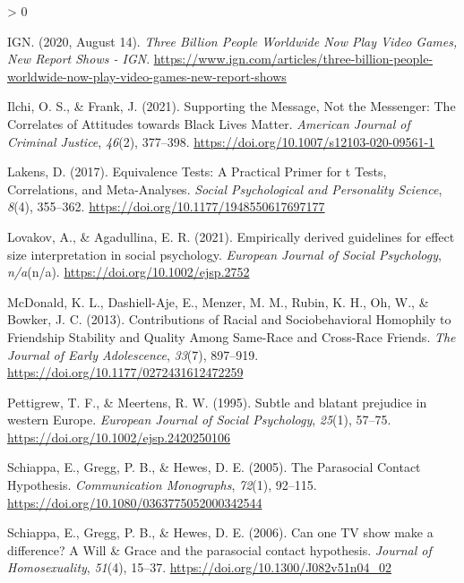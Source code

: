 \documentclass[
  english,
  man, noextraspace,floatsintext]{apa6}
\newlength{\cslhangindent}
\newenvironment{CSLReferences}[2] %
 {%
  \setlength{\parindent}{0pt}
  \ifodd #1 \everypar{\setlength{\hangindent}{\cslhangindent}}\ignorespaces\fi
  \ifnum #2 > 0
  \setlength{\parskip}{#2\baselineskip}
  \fi
 }%
 {}
\begin{document}
\begin{CSLReferences}{1}{0}
\leavevmode\hypertarget{ref-ignThreeBillionPeople2020}{}%
IGN. (2020, August 14). \emph{Three {Billion People Worldwide Now Play Video Games}, {New Report Shows} - {IGN}}. \url{https://www.ign.com/articles/three-billion-people-worldwide-now-play-video-games-new-report-shows}

\leavevmode\hypertarget{ref-ilchiSupportingMessageNot2021}{}%
Ilchi, O. S., \& Frank, J. (2021). Supporting the {Message}, {Not} the {Messenger}: {The Correlates} of {Attitudes} towards {Black Lives Matter}. \emph{American Journal of Criminal Justice}, \emph{46}(2), 377--398. \url{https://doi.org/10.1007/s12103-020-09561-1}

\leavevmode\hypertarget{ref-lakensEquivalenceTestsPractical2017}{}%
Lakens, D. (2017). Equivalence {Tests}: {A Practical Primer} for t {Tests}, {Correlations}, and {Meta}-{Analyses}. \emph{Social Psychological and Personality Science}, \emph{8}(4), 355--362. \url{https://doi.org/10.1177/1948550617697177}

\leavevmode\hypertarget{ref-lovakovEmpiricallyDerivedGuidelines2021}{}%
Lovakov, A., \& Agadullina, E. R. (2021). Empirically derived guidelines for effect size interpretation in social psychology. \emph{European Journal of Social Psychology}, \emph{n/a}(n/a). \url{https://doi.org/10.1002/ejsp.2752}

\leavevmode\hypertarget{ref-mcdonaldContributionsRacialSociobehavioral2013}{}%
McDonald, K. L., Dashiell-Aje, E., Menzer, M. M., Rubin, K. H., Oh, W., \& Bowker, J. C. (2013). Contributions of {Racial} and {Sociobehavioral Homophily} to {Friendship Stability} and {Quality Among Same}-{Race} and {Cross}-{Race Friends}. \emph{The Journal of Early Adolescence}, \emph{33}(7), 897--919. \url{https://doi.org/10.1177/0272431612472259}

\leavevmode\hypertarget{ref-pettigrewSubtleBlatantPrejudice1995}{}%
Pettigrew, T. F., \& Meertens, R. W. (1995). Subtle and blatant prejudice in western {Europe}. \emph{European Journal of Social Psychology}, \emph{25}(1), 57--75. \url{https://doi.org/10.1002/ejsp.2420250106}

\leavevmode\hypertarget{ref-schiappaParasocialContactHypothesis2005}{}%
Schiappa, E., Gregg, P. B., \& Hewes, D. E. (2005). The {Parasocial Contact Hypothesis}. \emph{Communication Monographs}, \emph{72}(1), 92--115. \url{https://doi.org/10.1080/0363775052000342544}

\leavevmode\hypertarget{ref-schiappaCanOneTV2006}{}%
Schiappa, E., Gregg, P. B., \& Hewes, D. E. (2006). Can one {TV} show make a difference? {A Will} \& {Grace} and the parasocial contact hypothesis. \emph{Journal of Homosexuality}, \emph{51}(4), 15--37. \url{https://doi.org/10.1300/J082v51n04_02}


\end{CSLReferences}
\end{document}
